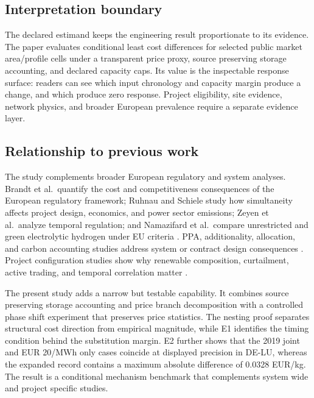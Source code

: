 \documentclass[largeformat]{interact}
\begin{document}
\subsection{Interpretation boundary}\label{interpretation-boundary}

The declared estimand keeps the engineering result proportionate to its
evidence. The paper evaluates conditional least cost differences for
selected public market area/profile cells under a transparent price
proxy, source preserving storage accounting, and declared capacity caps.
Its value is the inspectable response surface: readers can see which
input chronology and capacity margin produce a change, and which produce
zero response. Project eligibility, site evidence, network physics, and
broader European prevalence require a separate evidence layer.

\subsection{Relationship to previous
work}\label{relationship-to-previous-work}

The study complements broader European regulatory and system analyses.
Brandt et al.~quantify the cost and competitiveness consequences of the
European regulatory framework; Ruhnau and Schiele study how simultaneity
affects project design, economics, and power sector emissions; Zeyen et
al.~analyze temporal regulation; and Namazifard et al.~compare
unrestricted and green electrolytic hydrogen under EU criteria
\citep{ref01,ref02,ref03,ref04}. PPA, additionality, allocation, and
carbon accounting studies address system or contract design consequences
\citep{ref05,ref06,ref07,ref08,ref16,ref17,ref18}. Project configuration
studies show why renewable composition, curtailment, active trading, and
temporal correlation matter \citep{ref09,ref10,ref15,ref21,ref22}.

The present study adds a narrow but testable capability. It combines
source preserving storage accounting and price branch decomposition with
a controlled phase shift experiment that preserves price statistics. The
nesting proof separates structural cost direction from empirical
magnitude, while E1 identifies the timing condition behind the
substitution margin. E2 further shows that the 2019 joint and EUR 20/MWh
only cases coincide at displayed precision in DE-LU, whereas the
expanded record contains a maximum absolute difference of 0.0328 EUR/kg.
The result is a conditional mechanism benchmark that complements system
wide and project specific studies.
\end{document}

